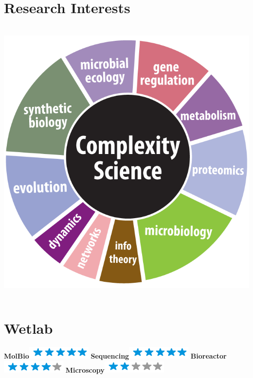 \documentclass[]{friggeri-cv}
\begin{document}
\begin{aside}
~
~
~
~
~
\section{Research Interests}
     ~
    \includegraphics[scale=0.6]{img/interests.png}
    ~
\section{Wetlab}
    \textbf{MolBio}\includegraphics[scale=0.40]{img/5stars.png}
    \textbf{Sequencing}\includegraphics[scale=0.40]{img/5stars.png}
    \textbf{Bioreactor}\includegraphics[scale=0.40]{img/4stars.png}
    \textbf{Microscopy}\includegraphics[scale=0.40]{img/2stars.png}
    ~

\end{aside}
\end{document}

